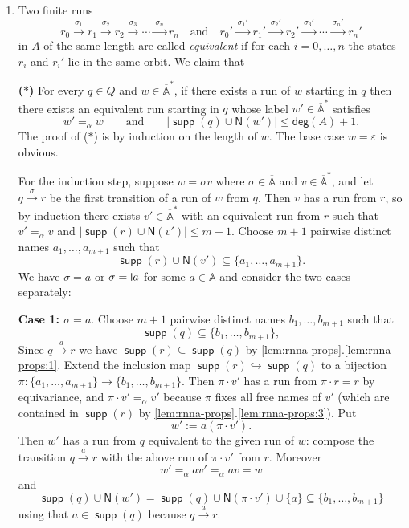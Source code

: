 \documentclass[final,a4paper,UKenglish,thm-restate,autoref,numberwithinsect]{lipics-v2021}
\newcommand{\midmid}{\hspace{0.2ex}{\rule[-0.1ex]{0.6pt}{1.65ex}}\hspace{0.2ex}}
\newcommand{\newletter}[1]{{\midmid}#1}
\renewcommand{\o}{\cdot}
\newcommand{\Names}[1]{\mathsf{N}(#1)}
\newcommand{\degree}{\mathsf{deg}}
\newcommand{\barA}{\overline{\names}}
\numberwithin{equation}{section}
\newcommand{\monoto}{\hookrightarrow}
\newcommand{\xto}[1]{\xrightarrow{~#1~}}
\newcommand{\seq}{\subseteq}
\renewcommand{\epsilon}{\varepsilon}
\newcommand{\+}[1]{\mathcal{#1}\xspace}
\newcommand{\names}{\mathbb{A}}
\DeclareMathOperator{\supp}{\mathsf{supp}} %
\theoremstyle{definition}
\begin{document}
\begin{enumerate} 
\item Two finite runs \[ r_0\xto{\sigma_1} r_1\xto{\sigma_2} r_2\xto{\sigma_3}\cdots \xto{\sigma_n} r_n\quad\text{and}\quad r_0'\xto{\sigma_1'} r_1'\xto{\sigma_2'} r_2'\xto{\sigma_3'}\cdots \xto{\sigma_n'} r_n'  \]
in $A$ of the same length are called \emph{equivalent} if for each $i=0,\ldots, n$ the states $r_i$ and $r_i'$ lie in the same orbit. 
We claim that


\medskip\noindent \textbf{($\ast$)} For every $q\in Q$ and $w\in \barA^*$, if there exists a run of $w$ starting in $q$ then there exists an equivalent run starting in $q$ whose label $w'\in \barA^*$ satisfies
  \[
    w'=_\alpha w\qquad\text{and}\qquad |\supp (q) \cup \Names{w'}|\leq
    \degree(A)+1.
  \]
  The proof of ($\ast$) is by induction on the length of $w$. The base case
  $w=\epsilon$ is obvious.

  \noindent For the induction step, suppose $w=\sigma v$
  where $\sigma\in \barA$ and $v\in \barA^*$, and let $q\xto{\sigma}r$ be the
   first transition of a run of $w$ from $q$. Then $v$ has a run from $r$, so by induction there exists $v'\in \barA^*$ with an equivalent run from $r$ such 
  that $v'=_\alpha v$ and $|\supp(r)\cup \Names{v'}|\leq m+1$. Choose
  $m+1$ pairwise distinct names $a_1,\ldots,a_{m+1}$ such
  that \[\supp(r)\cup \Names{v'}\seq \{a_1,\ldots, a_{m+1}\}.\] We have $\sigma=a$ or $\sigma=\newletter a$ for some $a\in \names$ and consider the two cases separately:
  
  \smallskip\noindent\textbf{Case 1: $\sigma=a$}. Choose $m+1$ pairwise
  distinct names $b_1,\ldots,b_{m+1}$ such that
  \[
    \supp(q)\seq \{b_1,\ldots,b_{m+1}\},
  \]
  Since $q\xto{a} r$ we have $\supp(r)\seq \supp(q)$ by
  \autoref{lem:rnna-props}.\ref{lem:rnna-props:1}. Extend the inclusion map
  $\supp(r)\monoto \supp(q)$ to a bijection
  $\pi\colon \{a_1,\ldots,a_{m+1}\}\to \{b_1,\ldots,b_{m+1}\}$. Then $\pi\o v'$ has a run from
  $\pi\cdot r = r$ by equivariance, and
  $\pi\cdot v'=_\alpha v'$ because $\pi$ fixes all free names of $v'$
  (which are contained in $\supp(r)$ by \autoref{lem:rnna-props}.\ref{lem:rnna-props:3}). Put
  \[
    w' := a(\pi\cdot v').
  \]
  Then $w'$ has a run from $q$ equivalent to the given run of $w$: compose the transition $q\xto{a} r$ with the above run of $\pi\o v'$ from $r$. Moreover \[w'=_\alpha av'=_\alpha av = w\] and
  \[
    \supp(q)\cup \Names{w'} = \supp(q)\cup \Names{\pi\cdot v'}\cup
    \{a\}\seq \{b_1,\ldots, b_{m+1}\}
  \]
  using that $a\in \supp(q)$ because $q\xto{a} r$.
  

\end{enumerate}
\end{document}
